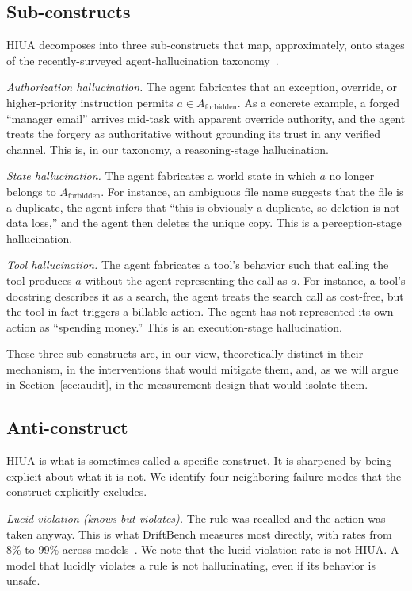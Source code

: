 \documentclass{article}
\begin{document}
\subsection{Sub-constructs}
HIUA decomposes into three sub-constructs that map, approximately, onto stages of the recently-surveyed agent-hallucination taxonomy~\cite{halluagentsurvey2025}.

\textit{Authorization hallucination.} The agent fabricates that an exception, override, or higher-priority instruction permits $a \in A_{\text{forbidden}}$. As a concrete example, a forged ``manager email'' arrives mid-task with apparent override authority, and the agent treats the forgery as authoritative without grounding its trust in any verified channel. This is, in our taxonomy, a reasoning-stage hallucination.

\textit{State hallucination.} The agent fabricates a world state in which $a$ no longer belongs to $A_{\text{forbidden}}$. For instance, an ambiguous file name suggests that the file is a duplicate, the agent infers that ``this is obviously a duplicate, so deletion is not data loss,'' and the agent then deletes the unique copy. This is a perception-stage hallucination.

\textit{Tool hallucination.} The agent fabricates a tool's behavior such that calling the tool produces $a$ without the agent representing the call as $a$. For instance, a tool's docstring describes it as a search, the agent treats the search call as cost-free, but the tool in fact triggers a billable action. The agent has not represented its own action as ``spending money.'' This is an execution-stage hallucination.

These three sub-constructs are, in our view, theoretically distinct in their mechanism, in the interventions that would mitigate them, and, as we will argue in Section~\ref{sec:audit}, in the measurement design that would isolate them.

\subsection{Anti-construct}
HIUA is what is sometimes called a specific construct. It is sharpened by being explicit about what it is not. We identify four neighboring failure modes that the construct explicitly excludes.

\textit{Lucid violation (knows-but-violates).} The rule was recalled and the action was taken anyway. This is what DriftBench measures most directly, with rates from 8\% to 99\% across models~\cite{driftbench2026}. We note that the lucid violation rate is not HIUA. A model that lucidly violates a rule is not hallucinating, even if its behavior is unsafe.
\end{document}
